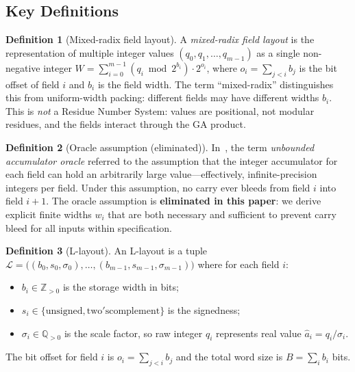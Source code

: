 \documentclass[11pt,a4paper]{article}
\theoremstyle{definition}
\newtheorem{definition}{Definition}[section]
\theoremstyle{plain}
\theoremstyle{remark}
\begin{document}
\subsection{Key Definitions}

\begin{definition}[Mixed-radix field layout]
\label{def:mixed-radix}
A \emph{mixed-radix field layout} is the representation of multiple
integer values $(q_0, q_1, \ldots, q_{m-1})$ as a single non-negative
integer
$W = \sum_{i=0}^{m-1} (q_i \bmod 2^{b_i}) \cdot 2^{o_i}$,
where $o_i = \sum_{j<i} b_j$ is the bit offset of field $i$ and
$b_i$ is the field width.
The term ``mixed-radix'' distinguishes this from uniform-width packing:
different fields may have different widths $b_i$.
This is \emph{not} a Residue Number System: values are positional, not
modular residues, and the fields interact through the GA product.
\end{definition}

\begin{definition}[Oracle assumption (eliminated)]
\label{def:oracle}
In~\cite{dang2025sketch}, the term \emph{unbounded accumulator oracle}
referred to the assumption that the integer accumulator for each field
can hold an arbitrarily large value---effectively, infinite-precision
integers per field.
Under this assumption, no carry ever bleeds from field $i$ into field
$i+1$.
The oracle assumption is \textbf{eliminated in this paper}: we derive
explicit finite widths $w_i$ that are both necessary and sufficient to
prevent carry bleed for all inputs within specification.
\end{definition}

\begin{definition}[L-layout]
\label{def:layout}
An L-layout is a tuple
$\mathcal{L} = \bigl((b_0, s_0, \sigma_0), \ldots, (b_{m-1}, s_{m-1}, \sigma_{m-1})\bigr)$
where for each field $i$:
\begin{itemize}
  \item $b_i \in \mathbb{Z}_{>0}$ is the storage width in bits;
  \item $s_i \in \{\mathrm{unsigned}, \mathrm{two'scomplement}\}$ is the signedness;
  \item $\sigma_i \in \mathbb{Q}_{>0}$ is the scale factor, so raw integer
        $q_i$ represents real value $\hat{a}_i = q_i / \sigma_i$.
\end{itemize}
The bit offset for field $i$ is $o_i = \sum_{j<i} b_j$ and the total
word size is $B = \sum_i b_i$ bits.
\end{definition}
\end{document}
